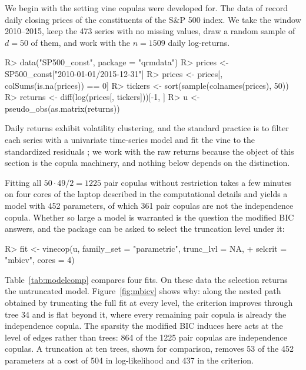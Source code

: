 \documentclass[article]{jss}
\begin{document}
We begin with the setting vine copulas were developed for.  The
 data of  record daily closing prices of the
constituents of the S\&P 500 index.  We take the window 2010--2015, keep the 473
series with no missing values, draw a random sample of $d = 50$ of them, and
work with the $n = 1509$ daily log-returns.

\begin{CodeChunk}
\begin{CodeInput}
R> data("SP500_const", package = "qrmdata")
R> prices <- SP500_const["2010-01-01/2015-12-31"]
R> prices <- prices[, colSums(is.na(prices)) == 0]
R> tickers <- sort(sample(colnames(prices), 50))
R> returns <- diff(log(prices[, tickers]))[-1, ]
R> u <- pseudo_obs(as.matrix(returns))
\end{CodeInput}
\end{CodeChunk}

Daily returns exhibit volatility clustering, and the standard practice is to
filter each series with a univariate time-series model and fit the vine to the
standardized residuals \citep{dissmann2013}; we work with the raw returns
because the object of this section is the copula machinery, and nothing below
depends on the distinction.

Fitting all $50 \cdot 49 / 2 = 1225$ pair copulas without restriction takes
a few minutes on four cores of the laptop described in the computational
details and yields a model with 452 parameters, of which 361 pair copulas are
not the independence copula.  Whether so large a model is warranted is the
question the modified BIC answers, and the package can be asked to select the
truncation level under it:

\begin{CodeChunk}
\begin{CodeInput}
R> fit <- vinecop(u, family_set = "parametric", trunc_lvl = NA,
+    selcrit = "mbicv", cores = 4)
\end{CodeInput}
\end{CodeChunk}

Table~\ref{tab:modelcomp} compares four fits.  On these data the selection
returns the untruncated model.  Figure~\ref{fig:mbicv} shows why: along the
nested path obtained by truncating the full fit at every level, the criterion
improves through tree 34 and is flat beyond it, where every remaining pair
copula is already the independence copula.  The sparsity the modified BIC
induces here acts at the level of edges rather than trees: 864 of the 1225
pair copulas are independence copulas.  A truncation at ten trees, shown for
comparison, removes 53 of the 452 parameters at a cost of 504 in
log-likelihood and 437 in the criterion.
\end{document}
